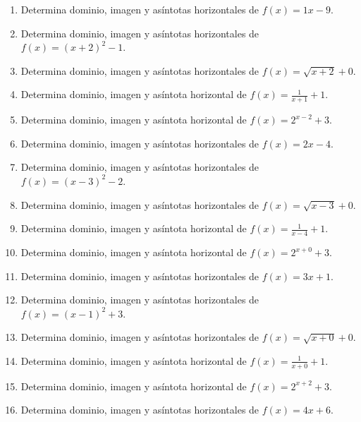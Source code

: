 \documentclass[11pt,a4paper]{article}
\begin{document}
\begin{enumerate}[label=\textbf{E\arabic*.},start=1]

\item Determina dominio, imagen y asíntotas horizontales de $f(x)=1x-9$.

\item Determina dominio, imagen y asíntotas horizontales de $f(x)=(x+2)^2-1$.

\item Determina dominio, imagen y asíntotas horizontales de $f(x)=\sqrt{x+2}+0$.

\item Determina dominio, imagen y asíntota horizontal de $f(x)=\frac{1}{x+1}+1$.

\item Determina dominio, imagen y asíntota horizontal de $f(x)=2^{x-2}+3$.

\item Determina dominio, imagen y asíntotas horizontales de $f(x)=2x-4$.

\item Determina dominio, imagen y asíntotas horizontales de $f(x)=(x-3)^2-2$.

\item Determina dominio, imagen y asíntotas horizontales de $f(x)=\sqrt{x-3}+0$.

\item Determina dominio, imagen y asíntota horizontal de $f(x)=\frac{1}{x-4}+1$.

\item Determina dominio, imagen y asíntota horizontal de $f(x)=2^{x+0}+3$.

\item Determina dominio, imagen y asíntotas horizontales de $f(x)=3x+1$.

\item Determina dominio, imagen y asíntotas horizontales de $f(x)=(x-1)^2+3$.

\item Determina dominio, imagen y asíntotas horizontales de $f(x)=\sqrt{x+0}+0$.

\item Determina dominio, imagen y asíntota horizontal de $f(x)=\frac{1}{x+0}+1$.

\item Determina dominio, imagen y asíntota horizontal de $f(x)=2^{x+2}+3$.

\item Determina dominio, imagen y asíntotas horizontales de $f(x)=4x+6$.


\end{enumerate}
\end{document}
